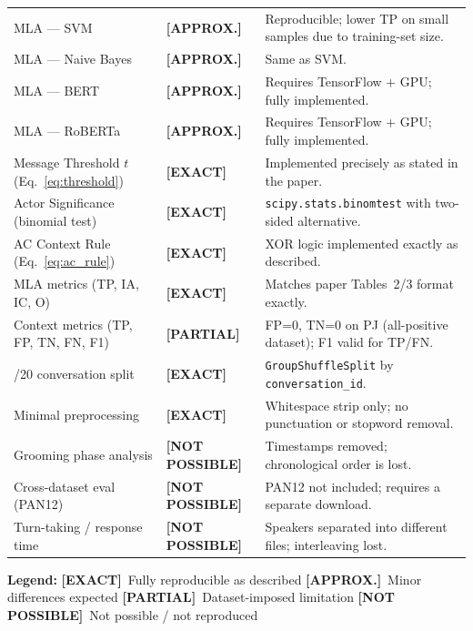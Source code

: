 \documentclass[12pt,a4paper]{article}
\newcommand{\exactbadge}{\textcolor{exactgreen}{\textbf{[EXACT]}}}
\newcommand{\approxbadge}{\textcolor{approxyellow}{\textbf{[APPROX.]}}}
\newcommand{\partialbadge}{\textcolor{partialblue}{\textbf{[PARTIAL]}}}
\newcommand{\notbadge}{\textcolor{notred}{\textbf{[NOT POSSIBLE]}}}
\begin{document}
\begin{longtable}{>{\raggedright\arraybackslash}p{4.2cm}
                  >{\centering\arraybackslash}p{2.1cm}
                  >{\raggedright\arraybackslash}p{7.5cm}}
  MLA --- SVM                & \approxbadge  &
    Reproducible; lower TP on small samples due to training-set size. \\
  \addlinespace
  MLA --- Naive Bayes        & \approxbadge  &
    Same as SVM. \\
  \addlinespace
  MLA --- BERT               & \approxbadge  &
    Requires TensorFlow + GPU; fully implemented. \\
  \addlinespace
  MLA --- RoBERTa            & \approxbadge  &
    Requires TensorFlow + GPU; fully implemented. \\
  \addlinespace
  Message Threshold $t$ (Eq.~\ref{eq:threshold}) & \exactbadge &
    Implemented precisely as stated in the paper. \\
  \addlinespace
  Actor Significance (binomial test) & \exactbadge &
    \texttt{scipy.stats.binomtest} with two-sided alternative. \\
  \addlinespace
  AC Context Rule (Eq.~\ref{eq:ac_rule}) & \exactbadge &
    XOR logic implemented exactly as described. \\
  \addlinespace
  MLA metrics (TP, IA, IC, O) & \exactbadge &
    Matches paper Tables~2/3 format exactly. \\
  \addlinespace
  Context metrics (TP, FP, TN, FN, F1) & \partialbadge &
    FP=0, TN=0 on PJ (all-positive dataset); F1 valid for TP/FN. \\
  \addlinespace
  80/20 conversation split   & \exactbadge  &
    \texttt{GroupShuffleSplit} by \texttt{conversation\_id}. \\
  \addlinespace
  Minimal preprocessing      & \exactbadge  &
    Whitespace strip only; no punctuation or stopword removal. \\
  \addlinespace
  Grooming phase analysis    & \notbadge    &
    Timestamps removed; chronological order is lost. \\
  \addlinespace
  Cross-dataset eval (PAN12) & \notbadge    &
    PAN12 not included; requires a separate download. \\
  \addlinespace
  Turn-taking / response time & \notbadge   &
    Speakers separated into different files; interleaving lost. \\
\end{longtable}

\textbf{Legend:}
\exactbadge\ Fully reproducible as described \quad
\approxbadge\ Minor differences expected \quad
\partialbadge\ Dataset-imposed limitation \quad
\notbadge\ Not possible / not reproduced
\end{document}

